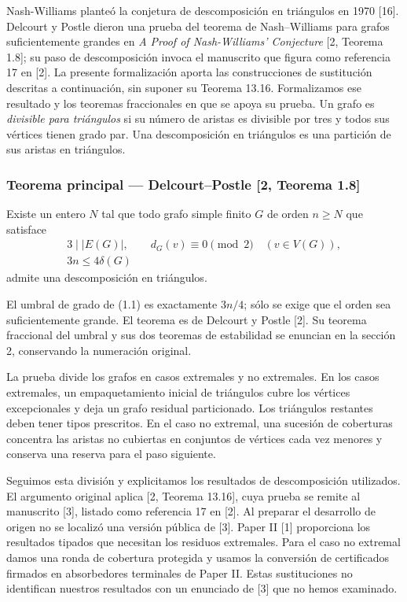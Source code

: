 \documentclass[spanish,11pt,a4paper]{article}
\begin{document}
Nash-Williams planteó la conjetura de descomposición en triángulos en 1970 {[}16{]}. Delcourt y Postle dieron una prueba del teorema de Nash--Williams para grafos suficientemente grandes en \emph{A Proof of Nash-Williams' Conjecture} {[}2, Teorema 1.8{]}; su paso de descomposición invoca el manuscrito que figura como referencia 17 en {[}2{]}. La presente formalización aporta las construcciones de sustitución descritas a continuación, sin suponer su Teorema 13.16. Formalizamos ese resultado y los teoremas fraccionales en que se apoya su prueba. Un grafo es \emph{divisible para triángulos} si su número de aristas es divisible por tres y todos sus vértices tienen grado par. Una descomposición en triángulos es una partición de sus aristas en triángulos.


\subsubsection{Teorema principal --- Delcourt--Postle {[}2, Teorema 1.8{]}}\label{teorema-principal-delcourtpostle-2-teorema-1.8}

Existe un entero \(N\) tal que todo grafo simple finito \(G\) de orden \(n\ge N\) que satisface \[\begin{gathered}
3\mid |E(G)|,\qquad d_G(v)\equiv0\pmod2\quad(v\in V(G)),\\
3n\le4\delta(G)
\end{gathered}
\tag{1.1}\] admite una descomposición en triángulos.

El umbral de grado de (1.1) es exactamente \(3n/4\); sólo se exige que el orden sea suficientemente grande. El teorema es de Delcourt y Postle {[}2{]}. Su teorema fraccional del umbral y sus dos teoremas de estabilidad se enuncian en la sección 2, conservando la numeración original.

La prueba divide los grafos en casos extremales y no extremales. En los casos extremales, un empaquetamiento inicial de triángulos cubre los vértices excepcionales y deja un grafo residual particionado. Los triángulos restantes deben tener tipos prescritos. En el caso no extremal, una sucesión de coberturas concentra las aristas no cubiertas en conjuntos de vértices cada vez menores y conserva una reserva para el paso siguiente.

Seguimos esta división y explicitamos los resultados de descomposición utilizados. El argumento original aplica {[}2, Teorema 13.16{]}, cuya prueba se remite al manuscrito {[}3{]}, listado como referencia 17 en {[}2{]}. Al preparar el desarrollo de origen no se localizó una versión pública de {[}3{]}. Paper II {[}1{]} proporciona los resultados tipados que necesitan los residuos extremales. Para el caso no extremal damos una ronda de cobertura protegida y usamos la conversión de certificados firmados en absorbedores terminales de Paper II. Estas sustituciones no identifican nuestros resultados con un enunciado de {[}3{]} que no hemos examinado.
\end{document}
